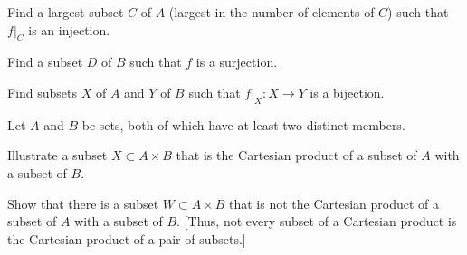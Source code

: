 	\item Find a largest subset $C$ of $A$ (largest in the number of elements of $C$) such that $f|_C$ is an injection. 
	
	\item Find a subset $D$ of $B$ such that $f$ is a surjection.
	
	\item Find subsets $X$ of $A$ and $Y$ of $B$ such that $f|_X : X \to Y$ is a bijection. 
	
	\ea
	
\begin{comment}
\ExerciseSolution
	\ba
	\item Since $f(1) = f(6) = c$, we conclude that $f$ is not an injection. There is no preimage of $b$ in B$, so $f$ is not a surjection.
	
	\item We need each output to be the preimage of exactly one input. This will be the case if $C = \{1,2,3,4,7\}$. 
	
	\item In this case we need $D$ to be the set of all outputs of $f$. So $D = \{a,c,d,e,g\}$. 
	
	\item We can use the set $C$ from (b) and the set $D$ from (c). 
		
	\ea


\end{comment}


\item Let $A$ and $B$ be sets, both of which have at least two distinct members. 
\ba
\item Illustrate a subset $X \subset A \times B$ that is the Cartesian product of a subset of $A$ with a subset of $B$.

\item Show that there is a subset $W \subset A \times B$ that is not the Cartesian product of a subset of $A$ with a subset of $B$. [Thus, not every subset of a Cartesian product is the Cartesian product of a pair of subsets.]

\ea

